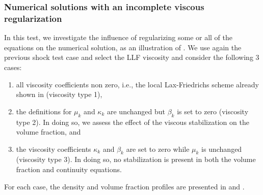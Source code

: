 \subsubsection{Numerical solutions with an incomplete viscous regularization}\label{sec:incompete-visc-reg}
In this test, we investigate the influence of regularizing some or all of the equations on the numerical solution, as an illustration 
of . %
We use again the previous shock test case and select the LLF viscosity and consider the following 3 cases:
%
\begin{enumerate}
\item all viscosity coefficients non zero, i.e., the local Lax-Friedrichs scheme already shown in  (viscosity type 1), 
\item the definitions for $\mu_k$ and $\kappa_k$ are unchanged but $\beta_k$ is set to zero (viscosity type 2). In doing so, we assess the effect of the viscous stabilization on the volume fraction, and 
\item the viscosity coefficients $\kappa_k$ and $\beta_k$ are set to zero while $\mu_k$ is unchanged (viscosity type 3). In doing so, no stabilization is present in both the volume fraction and continuity equations. 
\end{enumerate}
%
For each case, the density and volume fraction profiles are presented in  and .
%

